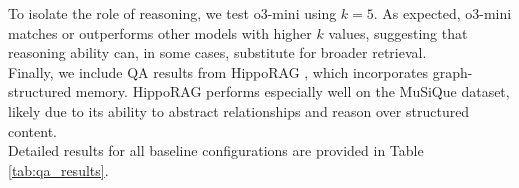 

\noindent To isolate the role of reasoning, we test o3-mini using $k = 5$. As expected, o3-mini matches or outperforms other models with higher $k$ values, suggesting that reasoning ability can, in some cases, substitute for broader retrieval.\\

\noindent Finally, we include QA results from HippoRAG \cite{NEURIPS2024_6ddc001d}, which incorporates graph-structured memory. HippoRAG performs especially well on the MuSiQue dataset, likely due to its ability to abstract relationships and reason over structured content. \\

\noindent Detailed results for all baseline configurations are provided in Table \ref{tab:qa_results}.


